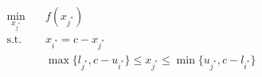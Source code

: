 \begin{subequations}\label{eq:onecomp} 
\begin{align}
\min_{ x_{j^*}} & \quad f(x_{j^*}) \\
\text{s.t.} & \quad x_{i^*} = c - x_{j^*} \\
& \quad \max\{l_{j^*}, c - u_{i^*}\} \leq x_{j^*} \leq \min \{ u_{j^*}, c-l_{i^*}\}
\end{align}
\end{subequations}
